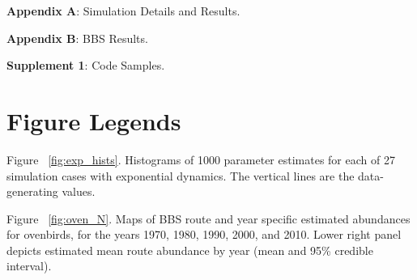 \documentclass[12pt,english]{article}
\begin{document}
\begin{spacing}{1.9}
\begin{flushleft}


\begin{center}
\noindent{}\textbf{Appendix A}: Simulation Details and Results.

\noindent{}\textbf{Appendix B}: BBS Results.

\noindent{}\textbf{Supplement 1}: Code Samples.
\end{center}

\newpage


\clearpage

\section*{Figure Legends}
\noindent Figure ~\ref{fig:exp_hists}. Histograms of 1000 parameter estimates for each of 27
simulation cases with exponential dynamics. The vertical lines are the 
data-generating values.

\noindent Figure ~\ref{fig:oven_N}. Maps of BBS route and year specific estimated 
abundances for ovenbirds, for the years 1970, 1980, 1990, 2000, and 2010.  
Lower right panel depicts estimated mean route abundance by year
(mean and 95\% credible interval).


\end{flushleft}
\end{spacing}
\end{document}
